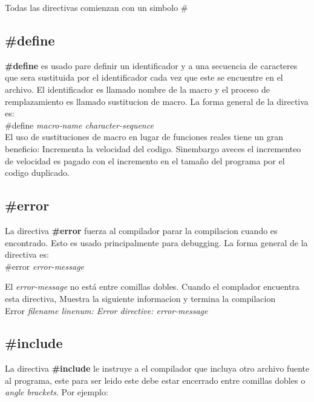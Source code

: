 \documentclass[]{article}
\begin{document}
		Todas las directivas comienzan con un simbolo \#
		
		\subsection{\#define}
		
		\textbf{\#define} es usado pare definir un identificador y a una secuencia de caracteres que sera sustituida por el identificador cada vez que este se encuentre en el archivo. El identificador es llamado nombre de la macro y el proceso de remplazamiento es llamado sustitucion de macro. La forma general de la directiva es:\\
		
			\#define \textit{macro-name character-sequence}\\
			
		El uso de sustituciones de macro en lugar de funciones reales tiene un gran beneficio: Incrementa la velocidad del codigo. Sinembargo aveces el incrementeo de velocidad es pagado con el incremento en el tamaño del programa por el codigo duplicado.
		
		\subsection{\#error}
		
		La directiva \textbf{\#error} fuerza al compilador parar la compilacion cuando es encontrado. Esto es usado principalmente para debugging. La forma general de la directiva es:\\
		
			\#error \textit{error-message}
			
		El \textit{error-message} no está entre comillas dobles. Cuando el complador encuentra esta directiva, Muestra la siguiente informacion y termina la compilacion\\
		
			Error \textit{filename linenum: Error directive: error-message}
			
		\subsection{\#include}
		
		La directiva \textbf{\#include} le instruye a el compilador que incluya otro archivo fuente al programa, este para ser leido este debe estar encerrado entre comillas dobles o \textit{angle brackets}. Por ejemplo:\\
		
\end{document}
